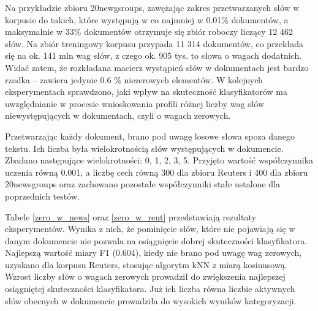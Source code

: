 \documentclass{pracamgr}
\begin{document}
Na przykładzie zbioru 20newgsroups, zawężając zakres przetwarzanych słów w korpusie do takich, które występują w co najmniej w 0.01\% dokumentów, a maksymalnie w 33\% dokumentów otrzymuje się zbiór roboczy liczący 12 462 słów. Na zbiór treningowy korpusu przypada 11 314 dokumentów, co przekłada się na ok. 141 mln wag słów, z czego ok. 905 tys. to słowa o wagach dodatnich. Widać zatem, że rozkładana macierz wystąpień słów w dokumentach jest bardzo rzadka -- zawiera jedynie 0.6 \% niezerowych elementów. W kolejnych eksperymentach sprawdzono, jaki wpływ na skuteczność klasyfikatorów ma uwzględnianie w procesie wnioskowania profili różnej liczby wag słów niewystępujących w dokumentach, czyli o wagach zerowych. 

Przetwarzając każdy dokument, brano pod uwagę losowe słowa spoza danego tekstu. Ich liczba była wielokrotnością słów występujących w dokumencie. Zbadano następujące wielokrotności: 0, 1, 2, 3, 5. Przyjęto wartość współczynnika uczenia równą 0.001, a liczbę cech równą 300 dla zbioru Reuters i 400 dla zbioru 20newsgroups oraz zachowano pozostałe współczynniki stałe ustalone dla poprzednich testów. 

Tabele \ref{zero_w_news} oraz \ref{zero_w_reut} przedstawiają rezultaty eksperymentów. Wynika z nich, że pominięcie słów, które nie pojawiają się w danym dokumencie nie pozwala na osiągnięcie dobrej skuteczności klasyfikatora. Najlepszą wartość miary F1 (0.604), kiedy nie brano pod uwagę wag zerowych, uzyskano dla korpusu Reuters, stosując algorytm kNN z miarą kosinusową. Wzrost liczby słów o wagach zerowych prowadził do zwiększenia najlepszej osiągniętej skuteczności klasyfikatora. Już ich liczba równa liczbie aktywnych słów obecnych w dokumencie prowadziła do wysokich wyników kategoryzacji.

\begin{table}[]
\centering
{}
\caption{Zależność między współczynnikiem doboru wag zerowych a najlepszą dokładnością klasyfikatora - 20newsgroups}
\label{zero_w_news}
\end{table}
\end{document}
